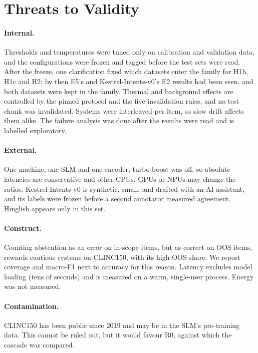 \documentclass[11pt,a4paper]{article}
\begin{document}
\section{Threats to Validity}\label{sec:threats}

\paragraph{Internal.} Thresholds and temperatures were tuned only on calibration and validation data, and the
configurations were frozen and tagged before the test sets were read. After the freeze, one clarification fixed which
datasets enter the family for H1b, H1c and H2; by then E5's and Kestrel-Intents-v0's E2 results had been seen, and both
datasets were kept in the family. Thermal and background effects are controlled by the pinned protocol and the five
invalidation rules, and no test chunk was invalidated. Systems were interleaved per item, so slow drift affects them
alike. The failure analysis was done after the results were read and is labelled exploratory.

\paragraph{External.} One machine, one SLM and one encoder; turbo boost was off, so absolute latencies are conservative
and other CPUs, GPUs or NPUs may change the ratios. Kestrel-Intents-v0 is synthetic, small, and drafted with an AI
assistant, and its labels were frozen before a second annotator measured agreement. Hinglish appears only in this set.

\paragraph{Construct.} Counting abstention as an error on in-scope items, but as correct on OOS items, rewards
cautious systems on CLINC150, with its high OOS share. We report coverage and macro-F1 next to accuracy for this reason.
Latency excludes model loading (tens of seconds) and is measured on a warm, single-user process. Energy was not
measured.

\paragraph{Contamination.} CLINC150 has been public since 2019 and may be in the SLM's pre-training data. This cannot
be ruled out, but it would favour R0, against which the cascade was compared.
\end{document}
